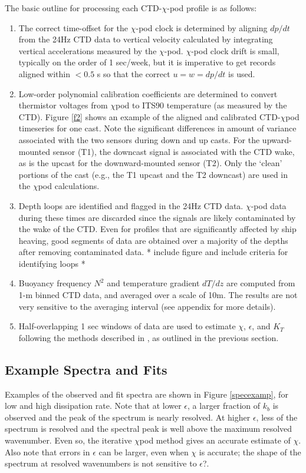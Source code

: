 \documentclass{ametsoc}
\begin{document}
The basic outline for processing each CTD-$\chi$-pod profile is as follows:
\begin{enumerate}
\item The correct time-offset for the $\chi$-pod clock is determined by aligning $dp/dt$ from the 24Hz CTD data to vertical velocity calculated by integrating vertical accelerations measured by the $\chi$-pod. $\chi$-pod clock drift is small, typically on the order of 1 sec/week, but it is imperative to get records aligned within $< 0.5$ s so that the correct $u = w = d p/dt$ is used.
\item Low-order polynomial calibration coefficients are determined to convert thermistor voltages from $\chi$pod to ITS90 temperature (as measured by
the CTD). Figure \ref{f2} shows an example of the aligned and calibrated CTD-$\chi$pod timeseries for one cast. Note the significant differences in amount of variance associated with the two sensors during down and up casts. For the upward-mounted sensor (T1), the downcast signal is associated with the CTD wake, as is the upcast for the downward-mounted sensor (T2). Only the `clean' portions of the cast (e.g., the T1 upcast and the T2 downcast) are used in the $\chi$pod calculations.
\item Depth loops are identified and flagged in the 24Hz CTD data. $\chi$-pod data during these times are discarded since the signals are likely contaminated by the wake of the CTD. Even for profiles that are significantly affected by ship heaving, good segments of data are obtained over a majority of the depths after removing contaminated data. * include figure and include criteria for identifying loops *
\item Buoyancy frequency $N^2$ and temperature gradient $dT/dz$ are computed from 1-m binned CTD data, and averaged over a scale of 10m. The results are not very sensitive to the averaging interval (see appendix for more details).
\item Half-overlapping 1 sec windows of data are used to estimate $\chi$, $\epsilon$, and $K_T$ following the methods described in \cite{moumnash09}, as outlined in the previous section.
\end{enumerate}


\subsection{Example Spectra and Fits}

Examples of the observed and fit spectra are shown in Figure \ref{specexamp}, for low and high dissipation rate. Note that at lower $\epsilon$, a larger fraction of $k_b$ is observed and the peak of the spectrum is nearly resolved. At higher $\epsilon$, less of the spectrum is resolved and the spectral peak is well above the maximum resolved wavenumber. Even so, the iterative $\chi$pod method gives an accurate estimate of $\chi$. Also note that errors in $\epsilon$ can be larger, even when $\chi$ is accurate; the shape of the spectrum at resolved wavenumbers is not sensitive to $\epsilon$?. 
\end{document}
